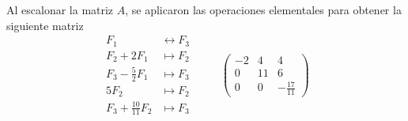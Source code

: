 \item Al escalonar la matriz \(A\), se aplicaron las operaciones elementales para obtener la siguiente matriz
    \[
        \begin{aligned}
            F_1 &\leftrightarrow F_3 \\
            F_2 + 2F_1 &\mapsto F_2 \\ 
            F_3 - \frac{5}{2}F_1 &\mapsto F_3 \\
            5F_2 &\mapsto F_2 \\ 
            F_3 + \frac{10}{11}F_2 &\mapsto F_3
        \end{aligned}
        \hspace{1cm}
        \begin{pmatrix}
            -2 & 4 & 4 \\ 
            0 & 11 & 6 \\ 
            0 & 0 & -\frac{17}{11}
        \end{pmatrix}
    \]
